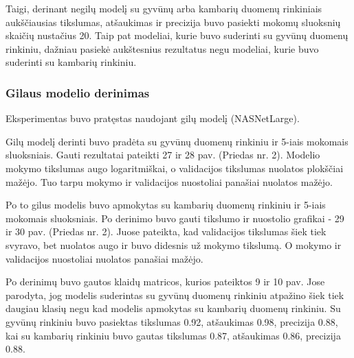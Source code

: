 \documentclass{VUMIFPSbakalaurinis}
\begin{document}
Taigi, derinant negilų modelį su gyvūnų arba kambarių duomenų rinkiniais aukščiausias tikslumas, atšaukimas ir precizija buvo pasiekti mokomų sluoksnių skaičių nustačius 20. Taip pat modeliai, kurie buvo suderinti su gyvūnų duomenų rinkiniu, dažniau pasiekė aukštesnius rezultatus negu modeliai, kurie buvo suderinti su kambarių rinkiniu. 

\subsubsection{Gilaus modelio derinimas}
Eksperimentas buvo pratęstas naudojant gilų modelį (NASNetLarge).

Gilų modelį derinti buvo pradėta su gyvūnų duomenų rinkiniu ir 5-iais mokomais sluoksniais.
Gauti rezultatai pateikti 27 ir 28 pav. (Priedas nr. 2). Modelio mokymo tikslumas augo logaritmiškai, o validacijos tikslumas nuolatos plokščiai mažėjo. Tuo tarpu mokymo ir validacijos nuostoliai panašiai nuolatos mažėjo.

Po to gilus modelis buvo apmokytas su kambarių duomenų rinkiniu ir 5-iais mokomais sluoksniais.
Po derinimo buvo gauti tikslumo ir nuostolio grafikai - 29 ir 30 pav. (Priedas nr. 2). Juose pateikta, kad validacijos tikslumas šiek tiek svyravo, bet nuolatos augo ir buvo didesnis už mokymo tikslumą. O mokymo ir validacijos nuostoliai nuolatos panašiai mažėjo.

Po derinimų buvo gautos klaidų matricos, kurios pateiktos 9 ir 10 pav. Jose parodyta, jog modelis suderintas su gyvūnų duomenų rinkiniu atpažino šiek tiek daugiau klasių negu kad modelis apmokytas su kambarių duomenų rinkiniu.
Su gyvūnų rinkiniu buvo pasiektas tikslumas 0.92, atšaukimas 0.98, precizija 0.88, kai su kambarių rinkiniu buvo gautas tikslumas 0.87, atšaukimas 0.86, precizija 0.88.
\end{document}
